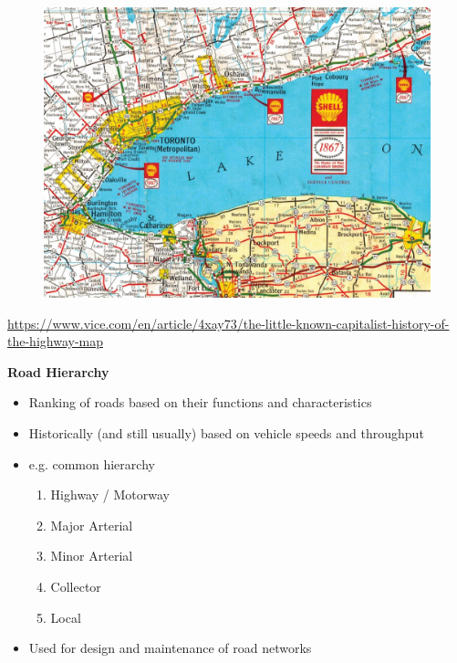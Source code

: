 \documentclass[aspectratio=169]{beamer}
\begin{document}
\begin{frame}
	
	\begin{figure}
		\centering
		\includegraphics[width=0.85\linewidth]{images/shell_map_ontario_1968.jpg}
		
	\end{figure}
	\tiny{\url{https://www.vice.com/en/article/4xay73/the-little-known-capitalist-history-of-the-highway-map}}
	
\end{frame}


\begin{frame}
	
	 \textbf{Road Hierarchy} \\
	 
	 \begin{itemize}
	 	\item Ranking of roads based on their functions and characteristics
	 	\item Historically (and still usually) based on vehicle speeds and throughput
	 	\item  e.g. common hierarchy
	 	\begin{enumerate}
	 		\item Highway / Motorway
	 		\item Major Arterial
	 		\item Minor Arterial
	 		\item Collector
	 		\item Local
	 	\end{enumerate}
 		\item Used for design and maintenance of road networks
	 \end{itemize}
	 

	
\end{frame}
\end{document}
